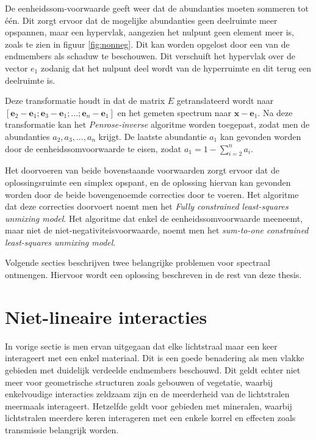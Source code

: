 \documentclass[12pt]{report}
\begin{document}
De eenheidssom-voorwaarde geeft weer dat de abundanties moeten sommeren tot \'e\'en. Dit zorgt ervoor dat de mogelijke abundanties geen deelruimte meer opspannen, maar een hypervlak, aangezien het nulpunt geen element meer is, zoals te zien in figuur \ref{fig:nonneg}. Dit kan worden opgelost door een van de endmembers als schaduw te beschouwen. Dit verschuift het hypervlak over de vector $e_1$ zodanig dat het nulpunt deel wordt van de hyperruimte en dit terug een deelruimte is.

Deze transformatie houdt in dat de matrix $E$ getranslateerd wordt naar $[\bm{e}_2-\bm{e}_1;\bm{e}_3-\bm{e}_1;...;\bm{e}_n-\bm{e}_1]$ en het gemeten spectrum naar $\bm{x} - \bm{e}_1$. Na deze transformatie kan het \textit{Penrose-inverse} algoritme worden toegepast, zodat men de abundanties $a_2,a_3,...,a_n$ krijgt. De laatste abundantie $a_1$ kan gevonden worden door de eenheidssomvoorwaarde te eisen, zodat $a_1 = 1 - \sum_{i=2}^{n} a_i$.

\vspace{5 mm}

Het doorvoeren van beide bovenstaande voorwaarden zorgt ervoor dat de oplossingsruimte een simplex opspant, en de oplossing hiervan kan gevonden worden door de beide bovengenoemde correcties door te voeren. Het algoritme dat deze correcties doorvoert noemt men het \textit{Fully constrained least-squares unmixing model}. Het algoritme dat enkel de eenheidssomvoorwaarde meeneemt, maar niet de niet-negativiteisvoorwaarde, noemt men het \textit{sum-to-one
constrained least-squares unmixing model}.

 
\vspace{5 mm}

Volgende secties beschrijven twee belangrijke problemen voor spectraal ontmengen. Hiervoor wordt een oplossing beschreven in de rest van deze thesis.


\section{Niet-lineaire interacties}

In vorige sectie is men ervan uitgegaan dat elke lichtstraal maar een keer interageert met een enkel materiaal. Dit is een goede benadering als men vlakke gebieden met duidelijk verdeelde endmembers beschouwd. Dit geldt echter niet meer voor geometrische structuren zoals gebouwen of vegetatie, waarbij enkelvoudige interacties zeldzaam zijn en de meerderheid van de lichtstralen meermaals interageert. Hetzelfde geldt voor gebieden met mineralen, waarbij lichtstralen meerdere keren interageren met een enkele korrel en effecten zoals transmissie belangrijk worden.
\end{document}
